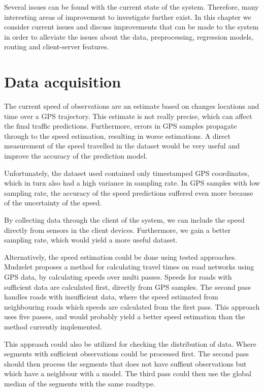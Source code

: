 Several issues can be found with the current state of the system. Therefore, many interesting areas of improvement to investigate further exist. In this chapter we consider current issues and discuss improvements that can be made to the system in order to alleviate the issues about the data, preprocessing, regression models, routing and client-server features.

\section{Data acquisition}
The current speed of observations are an estimate based on changes locations and time over a GPS trajectory. This estimate is not really precise, which can affect the final traffic predictions. Furthermore, errors in GPS samples propagate through to the speed estimation, resulting in worse estimations. A direct measurement of the speed travelled in the dataset would be very useful and improve the accuracy of the prediction model.

Unfortunately, the dataset used contained only timestamped GPS coordinates, which in turn also had a high variance in sampling rate. In GPS samples with low sampling rate, the accuracy of the speed predictions suffered even more because of the uncertainty of the speed.

By collecting data through the client of the system, we can include the speed directly from sensors in the client devices. Furthermore, we gain a better sampling rate, which would yield a more useful dataset.

Alternatively, the speed estimation could be done using tested approaches. Mudzelet\cite{Mudzelet07} proposes a method for calculating travel times on road networks using GPS data, by calculating speeds over multi passes. Speeds for roads with sufficient data are calculated first, directly from GPS samples. The second pass handles roads with insufficient data, where the speed estimated from neighbouring roads which speeds are calculated from the first pass. This approach uses five passes, and would probably yield a better speed estimation than the method currently implemented.

This approach could also be utilized for checking the distribution of data. Where segments with sufficient observations could be processed first. The second pass should then process the segments that does not have suffient observations but which have a neighbour with a model. The third pass could then use the global median of the segments with the same roadtype. 

